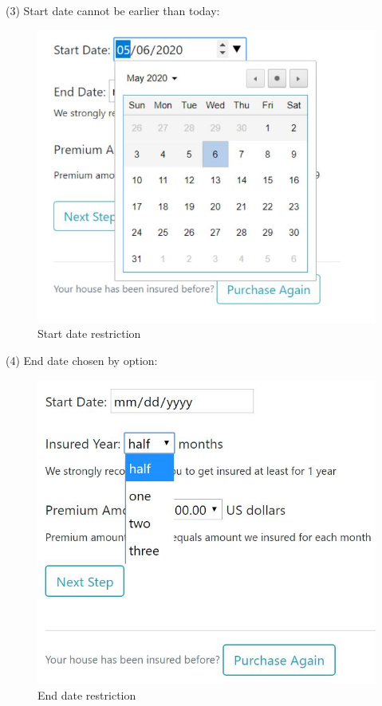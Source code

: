 \documentclass[12pt]{article}
\begin{document}
	\newpage
	\noindent(3) Start date cannot be earlier than today:
	\begin{figure}[H]
		\centering
		\includegraphics[scale=0.56]{startdatejquery}
		\caption{Start date restriction}
	\end{figure}
	\noindent(4) End date chosen by option:
	\begin{figure}[H]
		\centering
		\includegraphics[scale=0.5]{enddatejquery}
		\caption{End date restriction}
	\end{figure}
\end{document}
